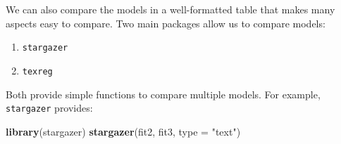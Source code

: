\documentclass[]{tufte-book}
\newenvironment{Shaded}{}{}
\newcommand{\KeywordTok}[1]{\textcolor[rgb]{0.00,0.44,0.13}{\textbf{#1}}}
\newcommand{\DataTypeTok}[1]{\textcolor[rgb]{0.56,0.13,0.00}{#1}}
\newcommand{\StringTok}[1]{\textcolor[rgb]{0.25,0.44,0.63}{#1}}
\newcommand{\NormalTok}[1]{#1}
\providecommand{\tightlist}{%
  \setlength{\itemsep}{0pt}\setlength{\parskip}{0pt}}
\theoremstyle{definition}
\theoremstyle{definition}
\theoremstyle{remark}
\begin{document}
We can also compare the models in a well-formatted table that makes many
aspects easy to compare. Two main packages allow us to compare models:

\begin{enumerate}
\def\labelenumi{\arabic{enumi}.}
\tightlist
\item
  \texttt{stargazer}
\item
  \texttt{texreg}
\end{enumerate}

Both provide simple functions to compare multiple models. For example,
\texttt{stargazer} provides:

\begin{Shaded}
\begin{Highlighting}[]
\KeywordTok{library}\NormalTok{(stargazer)}
\KeywordTok{stargazer}\NormalTok{(fit2, fit3, }\DataTypeTok{type =} \StringTok{"text"}\NormalTok{)}
\end{Highlighting}
\end{Shaded}
\end{document}
